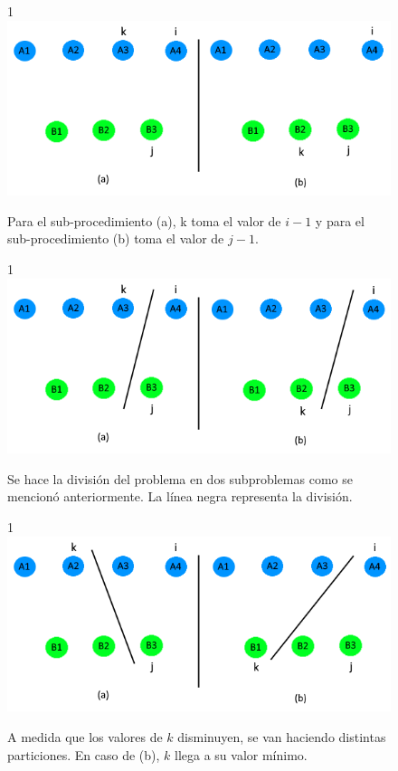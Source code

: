 \documentclass{article}
\begin{document}
    \begin{figure}[H]{1\textwidth}
    \centering
    \includegraphics[]{ada13.png}
    \caption{Para el sub-procedimiento (a), k toma el valor de $i - 1$ y para el sub-procedimiento (b) toma el valor de $j - 1$.}
    \label{fig:sub1}
    \end{figure}
    
    \begin{figure}[H]{1\textwidth}
    \centering
    \includegraphics[]{ada14.png}
    \caption{Se hace la división del problema en dos subproblemas como se mencionó anteriormente. La línea negra representa la división.}
    \label{fig:sub2}
    \end{figure}
    
    \begin{figure}[H]{1\textwidth}
    \centering
    \includegraphics[]{ada15.png}
    \caption{A medida que los valores de $k$ disminuyen, se van haciendo distintas particiones. En caso de (b), $k$ llega a su valor mínimo.}
    \label{fig:sub3}
    \end{figure}
    
\end{document}
